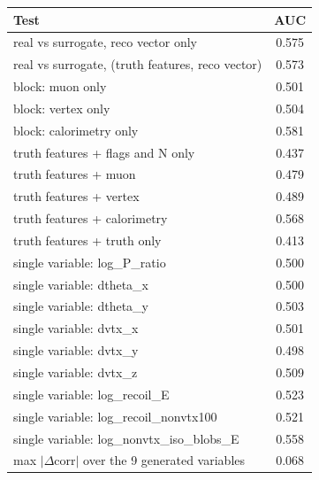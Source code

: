 \begin{tabular}{lc}
\toprule
Test & AUC \\
\midrule
real vs surrogate, reco vector only & 0.575 \\
real vs surrogate, (truth features, reco vector) & 0.573 \\
\midrule
block: muon only & 0.501 \\
block: vertex only & 0.504 \\
block: calorimetry only & 0.581 \\
truth features + flags and N only & 0.437 \\
truth features + muon & 0.479 \\
truth features + vertex & 0.489 \\
truth features + calorimetry & 0.568 \\
truth features + truth only & 0.413 \\
single variable: log\_P\_ratio & 0.500 \\
single variable: dtheta\_x & 0.500 \\
single variable: dtheta\_y & 0.503 \\
single variable: dvtx\_x & 0.501 \\
single variable: dvtx\_y & 0.498 \\
single variable: dvtx\_z & 0.509 \\
single variable: log\_recoil\_E & 0.523 \\
single variable: log\_recoil\_nonvtx100 & 0.521 \\
single variable: log\_nonvtx\_iso\_blobs\_E & 0.558 \\
\midrule
max $|\Delta$corr$|$ over the 9 generated variables & 0.068 \\
\bottomrule
\end{tabular}
